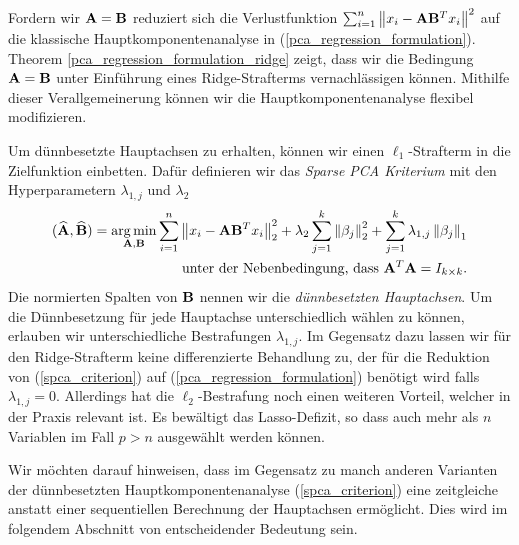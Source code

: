 Fordern wir $\mathbf{A} =  \mathbf{B}$ reduziert sich die Verlustfunktion $\sum_{i=1}^{n} \left\lVert x_i - \mathbf{A}\mathbf{B}^Tx_i \right\rVert^2$ auf die klassische Hauptkomponentenanalyse in (\ref{pca_regression_formulation}). Theorem \ref{pca_regression_formulation_ridge} zeigt, dass wir die Bedingung $\mathbf{A} = \mathbf{B}$ unter Einführung eines Ridge-Strafterms vernachlässigen können. Mithilfe dieser Verallgemeinerung können wir die Hauptkomponentenanalyse flexibel modifizieren.

Um dünnbesetzte Hauptachsen zu erhalten, können wir einen $\ell_1$-Strafterm in die Zielfunktion einbetten. Dafür definieren wir das \textit{Sparse PCA Kriterium} mit den Hyperparametern $\lambda_{1,j}$ und $\lambda_2$
\begin{align}
\label{spca_criterion}
\begin{split}
(\widehat{\mathbf{A}}, \widehat{\mathbf{B}}) = \operatorname*{arg\,min}_{\mathbf{A}, \mathbf{B}} \sum_{i=1}^{n} \left\lVert x_i - \mathbf{A}\mathbf{B}^Tx_i \right\rVert_2^2 + \lambda_2 \sum_{j=1}^{k}\left\lVert \beta_j \right\rVert_2^2 + \sum_{j=1}^k \lambda_{1,j} \left\lVert \beta_j \right\rVert_1\\
\text{unter der Nebenbedingung, dass } \mathbf{A}^T\mathbf{A} = I_{k \times k}.
\end{split}
\end{align}
Die normierten Spalten von $\mathbf{B}$ nennen wir die \textit{dünnbesetzten Hauptachsen}. Um die Dünnbesetzung für jede Hauptachse unterschiedlich wählen zu können, erlauben wir unterschiedliche Bestrafungen $\lambda_{1,j}$. Im Gegensatz dazu lassen wir für den Ridge-Strafterm keine differenzierte Behandlung zu, der für die Reduktion von (\ref{spca_criterion}) auf (\ref{pca_regression_formulation}) benötigt wird falls $\lambda_{1,j} = 0$. Allerdings hat die $\ell_2$-Bestrafung noch einen weiteren Vorteil, welcher in der Praxis relevant ist. Es bewältigt das Lasso-Defizit, so dass auch mehr als $n$ Variablen im Fall $p>n$ ausgewählt werden können.

Wir möchten darauf hinweisen, dass im Gegensatz zu manch anderen Varianten der dünnbesetzten Hauptkomponentenanalyse (\ref{spca_criterion}) eine zeitgleiche anstatt einer sequentiellen Berechnung der Hauptachsen ermöglicht. Dies wird im folgendem Abschnitt von entscheidender Bedeutung sein.





